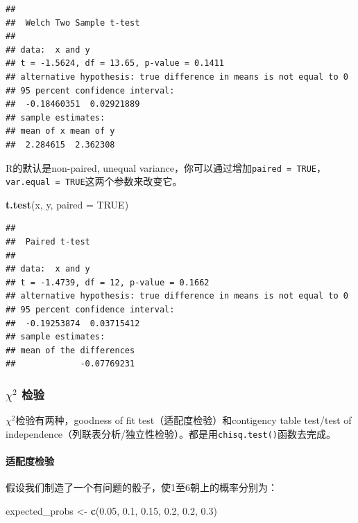 \documentclass[]{book}
\newenvironment{Shaded}{\begin{snugshade}}{\end{snugshade}}
\newcommand{\DataTypeTok}[1]{\textcolor[rgb]{0.13,0.29,0.53}{#1}}
\newcommand{\FloatTok}[1]{\textcolor[rgb]{0.00,0.00,0.81}{#1}}
\newcommand{\KeywordTok}[1]{\textcolor[rgb]{0.13,0.29,0.53}{\textbf{#1}}}
\newcommand{\NormalTok}[1]{#1}
\newcommand{\OtherTok}[1]{\textcolor[rgb]{0.56,0.35,0.01}{#1}}
\newcommand{\StringTok}[1]{\textcolor[rgb]{0.31,0.60,0.02}{#1}}
\let\oldparagraph\paragraph
\renewcommand{\paragraph}[1]{\oldparagraph{#1}\mbox{}}
\begin{document}
\begin{verbatim}
## 
##  Welch Two Sample t-test
## 
## data:  x and y
## t = -1.5624, df = 13.65, p-value = 0.1411
## alternative hypothesis: true difference in means is not equal to 0
## 95 percent confidence interval:
##  -0.18460351  0.02921889
## sample estimates:
## mean of x mean of y 
##  2.284615  2.362308
\end{verbatim}

R的默认是non-paired, unequal variance，你可以通过增加\texttt{paired\ =\ TRUE}，\texttt{var.equal\ =\ TRUE}这两个参数来改变它。

\begin{Shaded}
\begin{Highlighting}[]
\KeywordTok{t.test}\NormalTok{(x, y, }\DataTypeTok{paired =} \OtherTok{TRUE}\NormalTok{)}
\end{Highlighting}
\end{Shaded}

\begin{verbatim}
## 
##  Paired t-test
## 
## data:  x and y
## t = -1.4739, df = 12, p-value = 0.1662
## alternative hypothesis: true difference in means is not equal to 0
## 95 percent confidence interval:
##  -0.19253874  0.03715412
## sample estimates:
## mean of the differences 
##             -0.07769231
\end{verbatim}

\hypertarget{chi2-}{%
\subsubsection{\texorpdfstring{\(\chi^2\) 检验}{\textbackslash{}chi\^{}2 检验}}\label{chi2-}}

\(\chi^2\)检验有两种，goodness of fit test（适配度检验）和contigency table test/test of independence（列联表分析/独立性检验）。都是用\texttt{chisq.test()}函数去完成。

\paragraph{适配度检验}

假设我们制造了一个有问题的骰子，使1至6朝上的概率分别为：

\begin{Shaded}
\begin{Highlighting}[]
\NormalTok{expected_probs <-}\StringTok{ }\KeywordTok{c}\NormalTok{(}\FloatTok{0.05}\NormalTok{, }\FloatTok{0.1}\NormalTok{, }\FloatTok{0.15}\NormalTok{, }\FloatTok{0.2}\NormalTok{, }\FloatTok{0.2}\NormalTok{, }\FloatTok{0.3}\NormalTok{)}
\end{Highlighting}
\end{Shaded}
\end{document}
